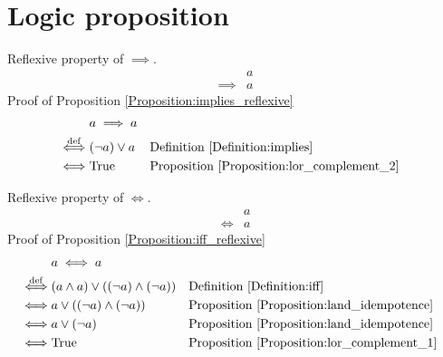 \section{Logic proposition}
\begin{prop}
\label{Proposition:implies_reflexive}
Reflexive property of $\implies$.
\begin{align*}
& a \\
\implies & a
\end{align*}
Proof of Proposition \ref{Proposition:implies_reflexive}
\begin{align*}
& a \implies a \\
\overset{\operatorname{def}}{\iff} & (\lnot a) \lor a
& & \text{Definition \ref{Definition:implies}} \\
\iff & \text{True}
& & \text{Proposition \ref{Proposition:lor_complement_2}} \\
\end{align*}
\end{prop}

\begin{prop}
\label{Proposition:iff_reflexive}
Reflexive property of $\iff$.
\begin{align*}
& a \\
\iff & a
\end{align*}
Proof of Proposition \ref{Proposition:iff_reflexive}
\begin{align*}
& a \iff a \\
\overset{\operatorname{def}}{\iff} & (a \land a) \lor ((\lnot a) \land (\lnot a))
& & \text{Definition \ref{Definition:iff}} \\
\iff & a \lor ((\lnot a) \land (\lnot a))
& & \text{Proposition \ref{Proposition:land_idempotence}} \\
\iff & a \lor (\lnot a)
& & \text{Proposition \ref{Proposition:land_idempotence}} \\
\iff & \text{True}
& & \text{Proposition \ref{Proposition:lor_complement_1}} \\
\end{align*}
\end{prop}

